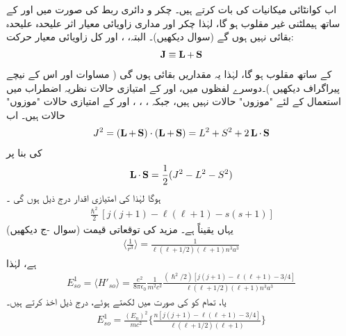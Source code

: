  اب کوانٹائی  میکانیات کی بات کرتے ہیں۔ چکر و دائری ربط کی صورت  میں  اور  کے ساتھ ہیملٹنی غیر مقلوب ہو گا،  لہٰذا چکر اور  مداری  زاویائی معیار اثر علیحدہ علیحدہ   بقائی  نہیں  ہوں گے   (سوال  دیکھیں)۔ البتہ،   ،  اور کل زاویائی معیار حرکت:
\begin{align}\label{مساوات_غیر_مضطرب_ایل_جمع_ایس_برابر_جے}
\operatorname{\mathbf{J}} \equiv \operatorname{\mathbf{L}} + \operatorname{\mathbf{S}}
\end{align}
کے ساتھ  مقلوب ہو گا،  لہٰذا   یہ مقداریں   بقائی  ہوں گی ( مساوات    اور اس کے نیچے پیراگراف دیکھیں )۔دوسرے لفظوں میں،   اور  کے امتیازی حالات نظریہ اضطراب میں استعمال کے لئے "موزوں" حالات نہیں ہیں،  جبکہ ، ، ، اور  کے امتیازی حالات  "موزوں" حالات ہیں۔ اب 
\begin{align*}
J^2 = (\operatorname{\mathbf{L}} + \operatorname{\mathbf{S}}) \cdot (\operatorname{\mathbf{L}} + \operatorname{\mathbf{S}}) = L^2 + S^2 + 2 \operatorname{\mathbf{L}} \cdot \operatorname{\mathbf{S}}
\end{align*}
کی بنا پر 
\begin{align}
\operatorname{\mathbf{L}} \cdot \operatorname{\mathbf{S}} = \frac{1}{2} (J^2 - L^2 - S^2)
\end{align}
ہوگا  لہٰذا    کی  امتیازی اقدار درج ذیل ہوں گی ۔
\begin{align*}
\frac{\hslash^2}{2} [j (j + 1) - \ell (\ell  + 1) - s(s + 1)]
\end{align*}
یہاں یقیناً  ہے۔  مزید  کی توقعاتی قیمت  (سوال  -ج  دیکھیں) 
\begin{align}\label{مساوات_غیر_مضطرب_آر_تین}
\big\langle \frac{1}{r^3} \big\rangle = \frac{1}{\ell (\ell  + 1/2) (\ell  + 1) n^3 a^3} 
\end{align}
 ہے، لہٰذا   
\begin{align*}
E_{so}^1 = \langle H'_{so} \rangle = \frac{e^2}{8 \pi \epsilon_0} \frac{1}{m^2 c^2} \frac{(\hslash^2 /2) [j(j + 1) - \ell (\ell  + 1) - 3/4]}{\ell (\ell  + 1/2)(\ell  + 1)n^3 a^3}
\end{align*} 
  یا، تمام  کو   کی صورت میں لکھتے ہوئے، درج ذیل اخذ کرتے ہیں۔ 
\begin{align}\label{مساوات_غیر_مضطرب_چکر_و_مدار_ربط}
E^1_{so} = \frac{(E_n)^2}{mc^2} \Big \{ \frac{n[j(j + 1) - \ell (\ell  + 1) - 3/4]}{\ell (\ell  + 1/2)(\ell  + 1)} \Big \}
\end{align}

